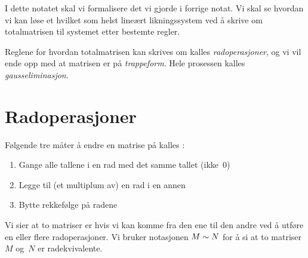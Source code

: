 
\usepackage{tikz}
\newcommand*\circled[1]{\tikz[baseline=(char.base)]{
            \node[shape=circle,draw,inner sep=2pt] (char) {#1};}}




\noindent%
I dette notatet skal vi formalisere det vi gjorde i forrige notat.  Vi
skal se hvordan vi kan løse et hvilket som helst lineært
likningssystem ved å skrive om totalmatrisen til systemet etter
bestemte regler.

Reglene for hvordan totalmatrisen kan skrives om kalles
\emph{radoperasjoner}, og vi vil ende opp med at matrisen er på
\emph{trappeform}.  Hele prosessen kalles \emph{gausseliminasjon}.





\section*{Radoperasjoner}



Følgende tre måter å endre en matrise på kalles
:
\begin{enumerate}
\item Gange alle tallene i en rad med det samme tallet (ikke~$0$)
\item Legge til (et multiplum av) en rad i en annen
\item Bytte rekkefølge på radene
\end{enumerate}

Vi sier at to matriser er  hvis vi kan komme
fra den ene til den andre ved å utføre en eller flere radoperasjoner.
Vi bruker notasjonen $M \sim N$ for å si at to matriser $M$ og~$N$
er radekvivalente.

